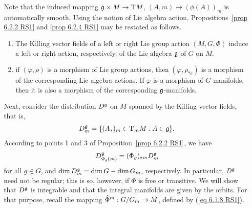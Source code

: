 Note that the induced mapping $\mathfrak{g}\times M\to \mathrm{T} M$, $(A,m)\mapsto (\phi(A))_m$ is automatically smooth. Using the notion of Lie algebra action, Propositions~\ref{prop 6.2.2 RS1} and \ref{prop 6.2.4 RS1} may be restated as follows.

\begin{cor}
    \begin{enumerate}
        \item The Killing vector fields of a left or right Lie group action $(M,G,\Phi)$ induce a left or right action, respectively, of the Lie algebra $\mathfrak{g}$ of $G$ on $M$.
        \item if $(\varphi,\rho)$ is a morphism of Lie group actions, then $(\varphi,\rho_{\ast e})$ is a morphism of the corresponding Lie algebra actions. If $\varphi$ is a morphism of $G$-manifolds, then it is also a morphism of the corresponding $\mathfrak{g}$-manifolds.
    \end{enumerate}
\end{cor}

Next, consider the distribution $D^{\mathfrak{g}}$ on $M$ spanned by the Killing vector fields, that is,
\[D^{\mathfrak{g}}_m=\{(A_\ast)_m\in \mathrm{T}_m M:A\in \mathfrak{g}\}.\]
According to points 1 and 3 of Proposition~\ref{prop 6.2.2 RS1}, we have
\[D^{\mathfrak{g}}_{\Phi_g(m)}=(\Phi_g)_{\ast m}D^{\mathfrak{g}}_m\label{eq 6.2.4 RS1}\]
for all $g\in G$, and $\dim D_m^{\mathfrak{g}}=\dim G-\dim G_m$, respectively. In particular, $D^{\mathfrak{g}}$ need not be regular; this is so, however, if $\Phi$ is free or transitive. We will show that $D^{\mathfrak{g}}$ is integrable and that the integral manifolds are given by the orbits. For that purpose, recall the mapping $\wh{\Phi}^m:G\slash G_m\to M$, defined by (\ref{eq 6.1.8 RS1}).

